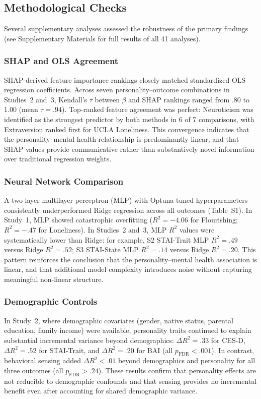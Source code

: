 \documentclass[12pt, a4paper]{article}
\begin{document}
\subsection{Methodological Checks}

Several supplementary analyses assessed the robustness of the primary findings (see Supplementary Materials for full results of all 41 analyses).

\subsubsection{SHAP and OLS Agreement}

SHAP-derived feature importance rankings closely matched standardized OLS regression coefficients. Across seven personality--outcome combinations in Studies~2 and~3, Kendall's $\tau$ between $\beta$ and SHAP rankings ranged from .80 to 1.00 (mean $\tau = .94$). Top-ranked feature agreement was perfect: Neuroticism was identified as the strongest predictor by both methods in 6 of 7 comparisons, with Extraversion ranked first for UCLA Loneliness. This convergence indicates that the personality--mental health relationship is predominantly linear, and that SHAP values provide communicative rather than substantively novel information over traditional regression weights.

\subsubsection{Neural Network Comparison}

A two-layer multilayer perceptron (MLP) with Optuna-tuned hyperparameters consistently underperformed Ridge regression across all outcomes (Table~S1). In Study~1, MLP showed catastrophic overfitting ($R^2 = -4.06$ for Flourishing; $R^2 = -.47$ for Loneliness). In Studies~2 and~3, MLP $R^2$ values were systematically lower than Ridge: for example, S2 STAI-Trait MLP $R^2 = .49$ versus Ridge $R^2 = .52$; S3 STAI-State MLP $R^2 = .14$ versus Ridge $R^2 = .20$. This pattern reinforces the conclusion that the personality--mental health association is linear, and that additional model complexity introduces noise without capturing meaningful non-linear structure.

\subsubsection{Demographic Controls}

In Study~2, where demographic covariates (gender, native status, parental education, family income) were available, personality traits continued to explain substantial incremental variance beyond demographics: $\Delta R^2 = .33$ for CES-D, $\Delta R^2 = .52$ for STAI-Trait, and $\Delta R^2 = .20$ for BAI (all $p_{\text{FDR}} < .001$). In contrast, behavioral sensing added $\Delta R^2 < .01$ beyond demographics and personality for all three outcomes (all $p_{\text{FDR}} > .24$). These results confirm that personality effects are not reducible to demographic confounds and that sensing provides no incremental benefit even after accounting for shared demographic variance.
\end{document}
